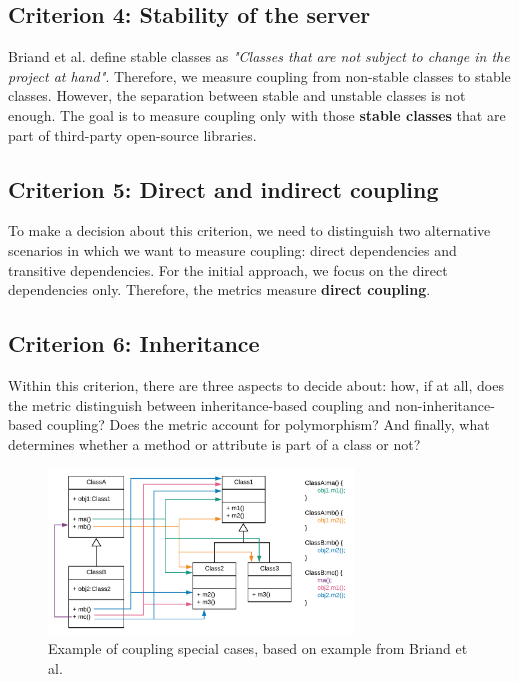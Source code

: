 \documentclass[a4paper]{article}
\begin{document}
\subsection{Criterion 4: Stability of the server}
Briand et al. \cite{briand1999unified} define stable classes as \textit{"Classes that are not subject to change in the project at hand"}. Therefore, we measure coupling from non-stable classes to stable classes.
However, the separation between stable and unstable classes is not enough. The goal is to measure coupling only with those \textbf{stable classes} that are part of third-party open-source libraries.

\subsection{Criterion 5: Direct and indirect coupling}
To make a decision about this criterion, we need to distinguish two alternative scenarios in which we want to measure coupling: direct dependencies and transitive dependencies. For the initial approach, we  focus on the direct dependencies only. Therefore, the metrics measure \textbf{direct coupling}.

\subsection{Criterion 6: Inheritance}
Within this criterion, there are three aspects to decide about: how, if at all, does the metric distinguish between inheritance-based coupling and non-inheritance-based coupling? Does the metric account for polymorphism? And finally, what determines whether a method or attribute is part of a class or not?

\begin{figure}[ht]
\begin{center}
\includegraphics[height=4.4cm]{img/specialcases.png}
\caption{Example of coupling special cases, based on example from Briand et al. \cite{briand1999unified}}
\label{fig:specialcases}
\end{center}
\end{figure}
\end{document}
